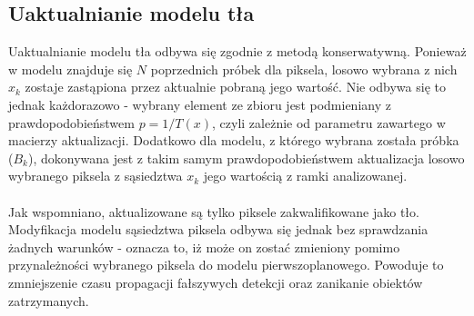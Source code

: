 \subsection{Uaktualnianie modelu tła}
Uaktualnianie modelu tła odbywa się zgodnie z metodą konserwatywną. Ponieważ w modelu znajduje się $N$ poprzednich próbek dla piksela, losowo wybrana z nich $x_{k}$ zostaje zastąpiona przez aktualnie pobraną jego wartość. Nie odbywa się to jednak każdorazowo - wybrany element ze zbioru jest podmieniany z prawdopodobieństwem $p = 1/T(x)$, czyli zależnie od parametru zawartego w macierzy aktualizacji. Dodatkowo dla modelu, z którego wybrana została próbka ($B_{k}$), dokonywana jest z takim samym prawdopodobieństwem aktualizacja losowo wybranego piksela z sąsiedztwa $x_{k}$ jego wartością z ramki analizowanej.
\paragraph{}
Jak wspomniano, aktualizowane są tylko piksele zakwalifikowane jako tło. Modyfikacja modelu sąsiedztwa piksela odbywa się jednak bez sprawdzania żadnych warunków - oznacza to, iż może on zostać zmieniony pomimo przynależności wybranego piksela do modelu pierwszoplanowego. Powoduje to zmniejszenie czasu propagacji fałszywych detekcji oraz zanikanie obiektów zatrzymanych.
